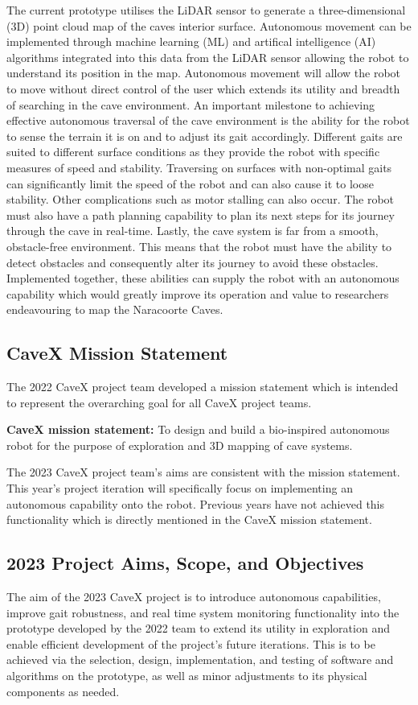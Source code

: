 The current prototype utilises the LiDAR sensor to generate a three-dimensional (3D) point cloud map of the caves interior surface. Autonomous movement can be implemented through machine learning (ML) and artifical intelligence (AI) algorithms integrated into this data from the LiDAR sensor allowing the robot to understand its position in the map. Autonomous movement will allow the robot to move without direct control of the user which extends its utility and breadth of searching in the cave environment. An important milestone to achieving effective autonomous traversal of the cave environment is the ability for the robot to sense the terrain it is on and to adjust its gait accordingly. Different gaits are suited to different surface conditions as they provide the robot with specific measures of speed and stability. Traversing on surfaces with non-optimal gaits can significantly limit the speed of the robot and can also cause it to loose stability. Other complications such as motor stalling can also occur. The robot must also have a path planning capability to plan its next steps for its journey through the cave in real-time. Lastly, the cave system is far from a smooth, obstacle-free environment. This means that the robot must have the ability to detect obstacles and consequently alter its journey to avoid these obstacles. Implemented together, these abilities can supply the robot with an autonomous capability which would greatly improve its operation and value to researchers endeavouring to map the Naracoorte Caves.

\subsection{CaveX Mission Statement}
The 2022 CaveX project team developed a mission statement which is intended to represent the overarching goal for all CaveX project teams.

\textbf{CaveX mission statement:} To design and build a bio-inspired autonomous robot for the purpose of exploration and 3D mapping of cave systems.

The 2023 CaveX project team's aims are consistent with the mission statement. This year's project iteration will specifically focus on implementing an autonomous capability onto the robot. Previous years have not achieved this functionality which is directly mentioned in the CaveX mission statement. 

\subsection{2023 Project Aims, Scope, and Objectives}
\label{aims_scope_objectives}
The aim of the 2023 CaveX project is to introduce autonomous capabilities, improve gait robustness, and real time system monitoring functionality into the prototype developed by the 2022 team to extend its utility in exploration and enable efficient development of the project's future iterations. This is to be achieved via the selection, design, implementation, and testing of software and algorithms on the prototype, as well as minor adjustments to its physical components as needed.

